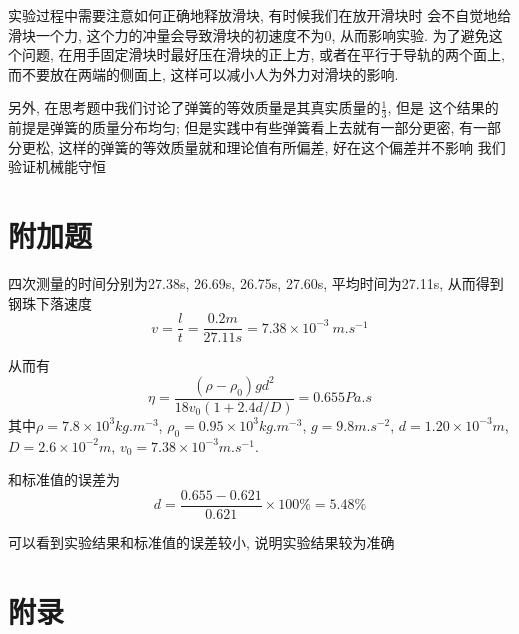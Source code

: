 \documentclass[zihao=5, UTF8]{article}
\theoremstyle{MyLineTheoremStyle} %
\theoremstyle{MyBlockTheoremStyle} %
\theoremstyle{MySubsubsectionStyle} %
\begin{document}
实验过程中需要注意如何正确地释放滑块, 有时候我们在放开滑块时
会不自觉地给滑块一个力, 这个力的冲量会导致滑块的初速度不为0,
从而影响实验. 为了避免这个问题, 在用手固定滑块时最好压在滑块的正上方,
或者在平行于导轨的两个面上, 而不要放在两端的侧面上, 这样可以减小人为外力对滑块的影响.

另外, 在思考题中我们讨论了弹簧的等效质量是其真实质量的$\tfrac{1}{3}$, 但是
这个结果的前提是弹簧的质量分布均匀; 但是实践中有些弹簧看上去就有一部分更密,
有一部分更松, 这样的弹簧的等效质量就和理论值有所偏差, 好在这个偏差并不影响
我们验证机械能守恒

\section{附加题}
四次测量的时间分别为27.38s, 26.69s, 26.75s, 27.60s, 平均时间为27.11s, 从而得到钢珠下落速度
\begin{equation}
v = \frac{l}{t} = \frac{0.2 \unit{m}}{27.11 \unit{s}} = 7.38 \times 10^{-3} \ \unit{m.s^{-1}}
\end{equation}

从而有
\begin{equation}
    \eta = \dfrac{(\rho - \rho_0)gd^2}{18v_0 (1 + 2.4 d / D)} =  0.655 \unit{Pa.s}
\end{equation}
其中$\rho = 7.8 \times 10^{3} \unit{kg.m^{-3}}$, $\rho_0 = 0.95 \times 10^{3} \unit{kg.m^{-3}}$, 
$g = 9.8 \unit{m.s^{-2}}$, $d = 1.20 \times 10^{-3} \unit{m}$, $D = 2.6 \times 10^{-2} \unit{m}$, 
$v_0 = 7.38 \times 10^{-3} \unit{m.s^{-1}}$.

和标准值的误差为
\begin{equation}
    d = \frac{0.655 - 0.621}{0.621} \times 100\% = 5.48\%
\end{equation}

可以看到实验结果和标准值的误差较小, 说明实验结果较为准确

\section{附录}


\end{document}
